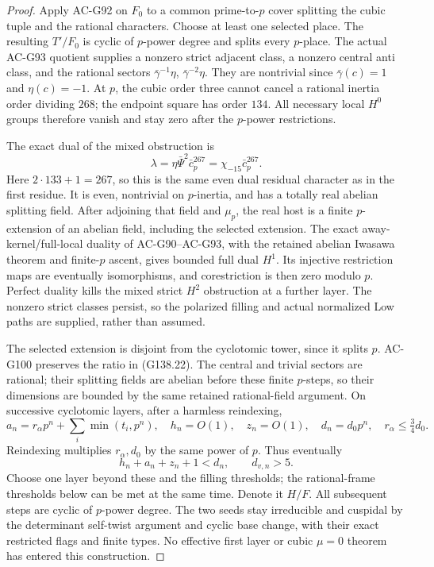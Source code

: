 \begin{proof}
Apply AC-G92 on \(F_0\) to a common prime-to-\(p\) cover
splitting the cubic tuple and the rational characters.
Choose at least one selected place.  The resulting
\(T'/F_0\) is cyclic of \(p\)-power degree and splits
every \(p\)-place.  The actual AC-G93 quotient supplies
a nonzero strict adjacent class, a nonzero central anti
class, and the rational sectors
\(\bar\gamma^{-1}\eta\), \(\bar\gamma^{-2}\eta\).
They are nontrivial since \(\bar\gamma(c)=1\) and
\(\eta(c)=-1\).  At \(p\), the cubic order three cannot
cancel a rational inertia order dividing \(268\); the
endpoint square has order \(134\).  All necessary local
\(H^0\) groups therefore vanish and stay zero after the
\(p\)-power restrictions.

The exact dual of the mixed obstruction is
\[
 \lambda=\eta\bar\Psi^2\bar c_p^{267}
         =\chi_{-15}\bar c_p^{267}.
 \tag{G138.24}
\]
Here \(2\cdot133+1=267\), so this is the same even dual
residual character as in the first residue.  It is even,
nontrivial on \(p\)-inertia, and has a totally real abelian
splitting field.  After adjoining that field
and \(\mu_p\), the real host is a finite \(p\)-extension
of an abelian field, including the selected extension.
The exact away-kernel/full-local duality of AC-G90--AC-G93,
with the retained abelian Iwasawa theorem and finite-\(p\)
ascent, gives bounded full dual \(H^1\).
Its injective restriction maps are eventually isomorphisms,
and corestriction is then zero modulo \(p\).
Perfect duality kills the mixed strict \(H^2\) obstruction
at a further layer.  The nonzero strict classes persist,
so the polarized filling and actual normalized Low paths
are supplied, rather than assumed.

The selected extension is disjoint from the cyclotomic tower,
since it splits \(p\).  AC-G100 preserves the ratio in
(G138.22).  The central and trivial sectors are rational;
their splitting fields are abelian before these finite
\(p\)-steps, so their dimensions are bounded by the same
retained rational-field argument.  On successive cyclotomic
layers, after a harmless reindexing,
\[
 a_n=r_\alpha p^n+\sum_i\min(t_i,p^n),\quad
 h_n=O(1),\quad z_n=O(1),\quad
 d_n=d_0p^n,\quad r_\alpha\le\tfrac34d_0.
 \tag{G138.25}
\]
Reindexing multiplies \(r_\alpha,d_0\) by the same power of
\(p\).  Thus eventually
\[
                     h_n+a_n+z_n+1<d_n,\qquad d_{v,n}>5.
 \tag{G138.26}
\]
Choose one layer beyond these and the filling thresholds;
the rational-frame thresholds below can be met at the same
time.  Denote it \(H/F\).
All subsequent steps are cyclic of \(p\)-power degree.
The two seeds stay irreducible and cuspidal by the determinant
self-twist argument and cyclic base change, with their exact
restricted flags and finite types.
No effective first layer or cubic \(\mu=0\) theorem has
entered this construction.


\end{proof}
